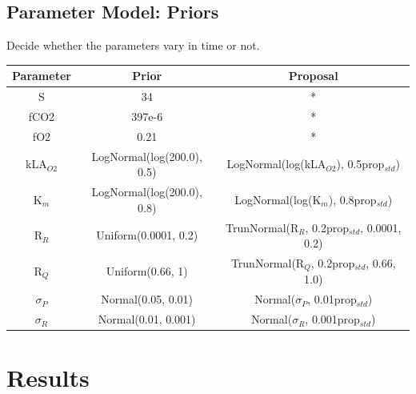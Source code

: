 \documentclass{ruthesis}
\begin{document}
\subsection{Parameter Model: Priors}
Decide whether the parameters vary in time or not.




\begin{tabular}{c | c  |  c}
	Parameter & Prior &  Proposal \\ \hline
	S  & 34 & * \\
	fCO2  & 397e-6 &  *  \\
	fO2  & 0.21 &  *  \\
	kLA$_{O2}$  & LogNormal(log(200.0), 0.5)  & LogNormal(log(kLA$_{O2}$), 0.5prop$_{std}$) \\
	K$_m$ &  LogNormal(log(200.0), 0.8)  & LogNormal(log(K$_m$), 0.8prop$_{std}$) \\
	R$_R$  & Uniform(0.0001, 0.2) &  TrunNormal(R$_R$, 0.2prop$_{std}$, 0.0001, 0.2) \\
	R$_Q$  & Uniform(0.66, 1) &  TrunNormal(R$_Q$, 0.2prop$_{std}$, 0.66, 1.0)
	 \\
	$\sigma_P$ & Normal(0.05, 0.01) & Normal($\sigma_P$, 0.01prop$_{std}$) \\
	$\sigma_R$ & Normal(0.01, 0.001) & Normal($\sigma_R$, 0.001prop$_{std}$) \\
	
\end{tabular}
\newpage


\FloatBarrier

\section{Results}
\end{document}
